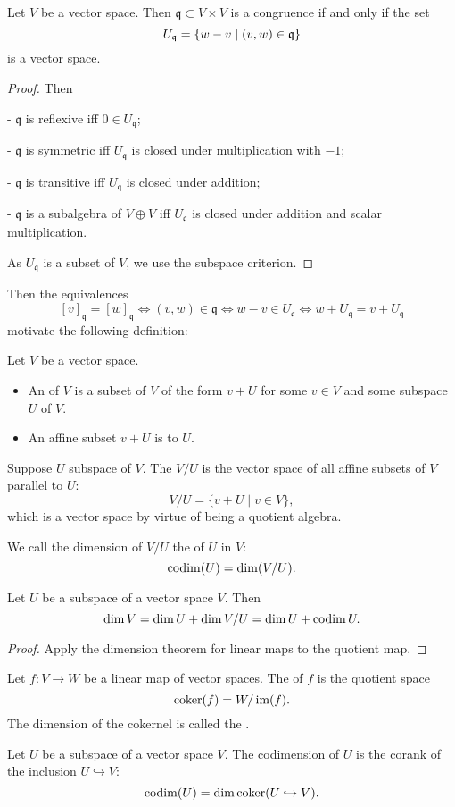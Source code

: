 \begin{proposition}
Let $V$ be a vector space. Then $\mathfrak{q}\subset V\times V$ is a congruence \textup{if and only if} the set
\[ U_\mathfrak{q} = \left\{ w-v \;\middle|\; (v,w)\in\mathfrak{q} \right\} \]
is a vector space.
\end{proposition}
\begin{proof} Then

- $\mathfrak{q}$ is reflexive iff $0\in U_\mathfrak{q}$;

- $\mathfrak{q}$ is symmetric iff $U_\mathfrak{q}$ is closed under multiplication with $-1$;

- $\mathfrak{q}$ is transitive iff $U_\mathfrak{q}$ is closed under addition;

- $\mathfrak{q}$ is a subalgebra of $V\oplus V$ iff $U_\mathfrak{q}$ is closed under addition and scalar multiplication.

As $U_\mathfrak{q}$ is a subset of $V$, we use the subspace criterion.
\end{proof}
Then the equivalences
\[ [v]_\mathfrak{q}=[w]_\mathfrak{q} \iff (v,w)\in\mathfrak{q} \iff w-v\in U_\mathfrak{q} \iff w+U_\mathfrak{q} = v+U_\mathfrak{q} \]
motivate the following definition:
\begin{definition}
Let $V$ be a vector space.
\begin{itemize}
\item An  of $V$ is a subset of $V$ of the form $v+U$ for some $v\in V$ and some subspace $U$ of $V$.
\item An affine subset $v+U$ is  to $U$.
\end{itemize}
Suppose $U$ subspace of $V$. The  $V/U$ is the vector space of all affine subsets of $V$ parallel to $U$:
\[ V/U = \{ v+U \;|\; v\in V \}, \]
which is a vector space by virtue of being a quotient algebra.

We call the dimension of $V/U$ the  of $U$ in $V$:
\[ \operatorname{codim}(U) = \dim(V/U). \]
\end{definition}

\begin{proposition}
Let $U$ be a subspace of a vector space $V$. Then
\[ \dim V = \dim U + \dim V/U = \dim U + \operatorname{codim} U.  \]
\end{proposition}
\begin{proof}
Apply the dimension theorem for linear maps to the quotient map.
\end{proof}

\begin{definition}
Let $f:V\to W$ be a linear map of vector spaces. The  of $f$ is the quotient space
\[ \operatorname{coker}(f) = W/\operatorname{im}(f). \]
The dimension of the cokernel is called the .
\end{definition}
\begin{lemma}
Let $U$ be a subspace of a vector space $V$. The codimension of $U$ is the corank of the inclusion $U\hookrightarrow V$:
\[ \operatorname{codim}(U) = \dim\operatorname{coker}(U\hookrightarrow V). \]
\end{lemma}

